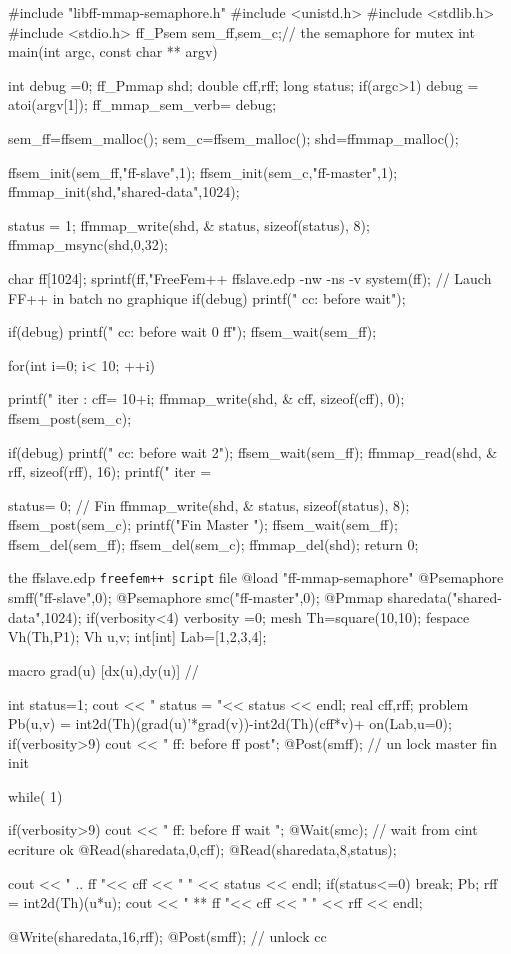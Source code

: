 \documentclass[a4paper,twoside,12pt]{book}
\def\n{\nabla}
\begin{document}
#include "libff-mmap-semaphore.h"
#include <unistd.h>
#include <stdlib.h>
#include <stdio.h>
ff_Psem sem_ff,sem_c;// the semaphore for mutex
int main(int argc, const char ** argv)
{
    int debug =0;
    ff_Pmmap shd;
    double cff,rff;
    long status;
    if(argc>1)  debug = atoi(argv[1]);
    ff_mmap_sem_verb= debug;

    sem_ff=ffsem_malloc();
    sem_c=ffsem_malloc();
    shd=ffmmap_malloc();
    
    ffsem_init(sem_ff,"ff-slave",1);
    ffsem_init(sem_c,"ff-master",1);
    ffmmap_init(shd,"shared-data",1024);
    
    status = 1;
    ffmmap_write(shd, & status, sizeof(status), 8);
    ffmmap_msync(shd,0,32);
    
    char ff[1024];
    sprintf(ff,"FreeFem++ ffslave.edp -nw -ns -v %
    system(ff); //  Lauch FF++ in batch no graphique
    if(debug) printf(" cc: before wait\n");
 

    
    if(debug)  printf(" cc: before wait 0 ff\n");
    ffsem_wait(sem_ff);
    
    for(int i=0; i< 10; ++i)
    {
        printf(" iter : %
        cff= 10+i;
       ffmmap_write(shd, & cff, sizeof(cff), 0);
       ffsem_post(sem_c);
 
        
       if(debug)  printf(" cc: before wait 2\n");
       ffsem_wait(sem_ff);
       ffmmap_read(shd, & rff, sizeof(rff), 16);
       printf(" iter = %
    }
    status= 0; // Fin
    ffmmap_write(shd, & status, sizeof(status), 8);
    ffsem_post(sem_c);
    printf("Fin Master \n");
    ffsem_wait(sem_ff);
    ffsem_del(sem_ff);
    ffsem_del(sem_c);
    ffmmap_del(shd);
    return 0;
}
\eFF	

the ffslave.edp \texttt{freefem++ script} file
\bFF
@load "ff-mmap-semaphore"
@Psemaphore smff("ff-slave",0);
@Psemaphore smc("ff-master",0);
@Pmmap sharedata("shared-data",1024);
if(verbosity<4) verbosity =0; 
mesh Th=square(10,10);
fespace Vh(Th,P1);
Vh u,v;
int[int] Lab=[1,2,3,4]; 

macro grad(u) [dx(u),dy(u)] //

int status=1;
cout << " status = "<< status << endl;
real cff,rff;
problem Pb(u,v) = int2d(Th)(grad(u)'*grad(v))-int2d(Th)(cff*v)+ on(Lab,u=0);
if(verbosity>9) cout << " ff: before ff post\n";
@Post(smff); // un lock master fin init 


while( 1)
{
	if(verbosity>9) cout << " ff: before ff wait \n";
	@Wait(smc); // wait from cint ecriture ok 
	@Read(sharedata,0,cff);
	@Read(sharedata,8,status);
	
	
	cout << " ..  ff "<< cff << " " << status << endl;
	if(status<=0) break; 
	Pb;
	rff = int2d(Th)(u*u);
	cout << " ** ff "<< cff << " " << rff << endl; 
	
	@Write(sharedata,16,rff);
	@Post(smff); // unlock cc  
}
\end{document}
